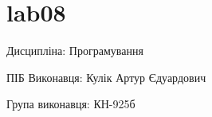\chapter{lab08}
\hypertarget{index}{}\label{index}
\label{index_md_README}%
%
 Дисципліна\+: Програмування

ПІБ Виконавця\+: Кулік Артур Єдуардович

Група виконавця\+: КН-\/925б 